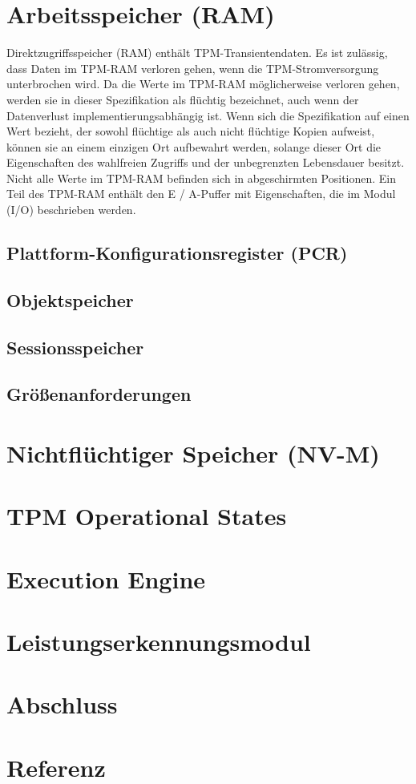 \section{Arbeitsspeicher (RAM)}
Direktzugriffsspeicher (RAM) enthält TPM-Transientendaten. Es ist zulässig, dass Daten im TPM-RAM verloren gehen, wenn die TPM-Stromversorgung unterbrochen wird. Da die Werte im TPM-RAM möglicherweise verloren gehen, werden sie in dieser Spezifikation als flüchtig bezeichnet, auch wenn der Datenverlust implementierungsabhängig ist.
Wenn sich die Spezifikation auf einen Wert bezieht, der sowohl flüchtige als auch nicht flüchtige Kopien aufweist, können sie an einem einzigen Ort aufbewahrt werden, solange dieser Ort die Eigenschaften des wahlfreien Zugriffs und der unbegrenzten Lebensdauer besitzt. \\
Nicht alle Werte im TPM-RAM befinden sich in abgeschirmten Positionen. Ein Teil des TPM-RAM enthält den E / A-Puffer mit Eigenschaften, die im Modul (I/O) beschrieben werden.
\subsection{Plattform-Konfigurationsregister (PCR)}
\subsection{Objektspeicher}
\subsection{Sessionsspeicher}
\subsection{Größenanforderungen}

\section{Nichtflüchtiger Speicher (NV-M)}
\section{TPM Operational States}
\section{Execution Engine}

\section{Leistungserkennungsmodul}
\section{Abschluss}

\section{Referenz}







